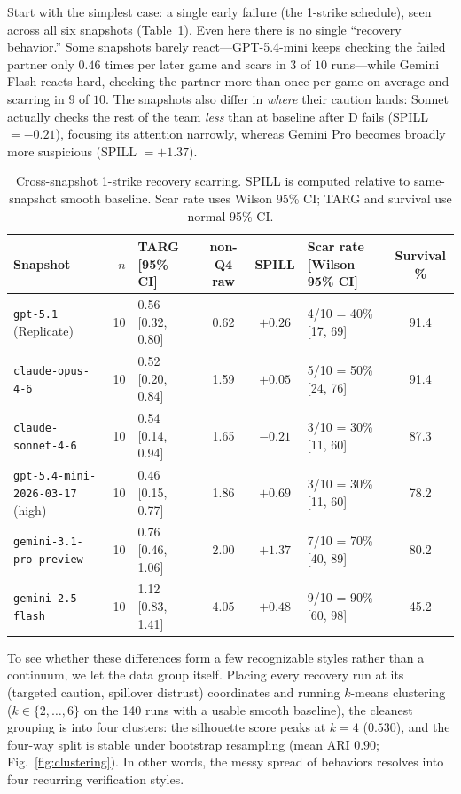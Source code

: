 \documentclass{article}
\begin{document}
Start with the simplest case: a single early failure (the 1-strike schedule), seen across all six snapshots (Table~\ref{tab:profiles}). Even here there is no single ``recovery behavior.'' Some snapshots barely react---GPT-5.4-mini keeps checking the failed partner only $0.46$ times per later game and scars in $3$ of $10$ runs---while Gemini Flash reacts hard, checking the partner more than once per game on average and scarring in $9$ of $10$. The snapshots also differ in \emph{where} their caution lands: Sonnet actually checks the rest of the team \emph{less} than at baseline after D fails (SPILL $=-0.21$), focusing its attention narrowly, whereas Gemini Pro becomes broadly more suspicious (SPILL $=+1.37$).

\begin{table}[h]
\centering
\caption{Cross-snapshot 1-strike recovery scarring. SPILL is computed relative to same-snapshot smooth baseline. Scar rate uses Wilson 95\% CI; TARG and survival use normal 95\% CI.}
\label{tab:profiles}
\small
\begin{tabular}{lrlcclc}
\toprule
Snapshot & $n$ & TARG [95\% CI] & non-Q4 raw & SPILL & Scar rate [Wilson 95\% CI] & Survival \% \\
\midrule
\texttt{gpt-5.1} (Replicate)             & 10 & 0.56 [0.32, 0.80] & 0.62 & $+0.26$ & 4/10 = 40\% [17, 69]  & 91.4 \\
\texttt{claude-opus-4-6}                 & 10 & 0.52 [0.20, 0.84] & 1.59 & $+0.05$ & 5/10 = 50\% [24, 76]  & 91.4 \\
\texttt{claude-sonnet-4-6}               & 10 & 0.54 [0.14, 0.94] & 1.65 & $-0.21$ & 3/10 = 30\% [11, 60]  & 87.3 \\
\texttt{gpt-5.4-mini-2026-03-17} (high)  & 10 & 0.46 [0.15, 0.77] & 1.86 & $+0.69$ & 3/10 = 30\% [11, 60]  & 78.2 \\
\texttt{gemini-3.1-pro-preview}          & 10 & 0.76 [0.46, 1.06] & 2.00 & $+1.37$ & 7/10 = 70\% [40, 89]  & 80.2 \\
\texttt{gemini-2.5-flash}                & 10 & 1.12 [0.83, 1.41] & 4.05 & $+0.48$ & 9/10 = 90\% [60, 98]  & 45.2 \\
\bottomrule
\end{tabular}
\end{table}

To see whether these differences form a few recognizable styles rather than a continuum, we let the data group itself. Placing every recovery run at its (targeted caution, spillover distrust) coordinates and running $k$-means clustering ($k \in \{2,\dots,6\}$ on the 140 runs with a usable smooth baseline), the cleanest grouping is into four clusters: the silhouette score peaks at $k=4$ ($0.530$), and the four-way split is stable under bootstrap resampling (mean ARI $0.90$; Fig.~\ref{fig:clustering}). In other words, the messy spread of behaviors resolves into four recurring verification styles.
\end{document}
